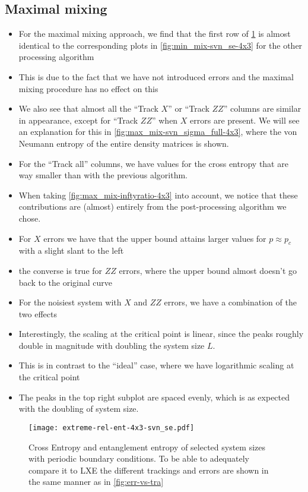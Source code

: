\subsection{Maximal mixing}
\begin{itemize}
  \item For the maximal mixing approach, we find that the first row of
    \cref{fig:max_mix-svn_se-4x3} is almost identical to the corresponding
    plots in \cref{fig:min_mix-svn_se-4x3} for the other processing
    algorithm
  \item This is due to the fact that we have not introduced errors and the
    maximal mixing procedure has no effect on this
  \item We also see that almost all the \enquote{Track $X$} or \enquote{Track
    $ZZ$} columns are similar in appearance, except for \enquote{Track $ZZ$}
    when $X$ errors are present. We will see an explanation for this in
    \cref{fig:max_mix-svn_sigma_full-4x3}, where the von Neumann entropy of the
    entire density matrices is shown.
  \item For the \enquote{Track all} columns, we have values for the cross
    entropy that are way smaller than with the previous algorithm. 
  \item When taking \cref{fig:max_mix-inftyratio-4x3} into account, we notice
    that these contributions are (almost) entirely from the post-processing
    algorithm we chose.
  \item For $X$ errors we have that the upper bound attains larger values for
    $p \approx p_c$ with a slight slant to the left
  \item the converse is true for $ZZ$ errors, where the upper bound almost
    doesn't go back to the original curve
  \item For the noisiest system with $X$ and $ZZ$ errors, we have a combination
    of the two effects
  \item Interestingly, the scaling at the critical point is linear, since the
    peaks roughly double in magnitude with doubling the system size $L$.
  \item This is in contrast to the \enquote{ideal} case, where we have
    logarithmic scaling at the critical point
  \item The peaks in the top right subplot are spaced evenly, which is as
    expected with the doubling of system size.
\end{itemize}
\begin{figure}[p]
  \centering
  \texttt{[image: extreme-rel-ent-4x3-svn\_se.pdf]}
  \caption{Cross Entropy and entanglement entropy of selected system sizes with
  periodic boundary conditions. To be able to adequately compare it to LXE the
different trackings and errors are shown in the same manner as in
\cref{fig:err-vs-tra}}
  \label{fig:max_mix-svn_se-4x3}
\end{figure}
